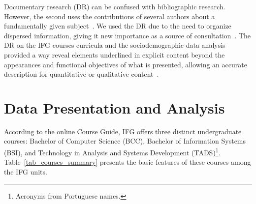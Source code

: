 \documentclass[sigconf, review]{educomp}
\begin{document}
Documentary research (DR) can be confused with bibliographic research. However, the second uses the contributions of several authors about a fundamentally given subject~\cite{gil2008metodos}.
We used the DR due to the need to organize dispersed information, giving it new importance as a source of consultation~\cite{prodanov2013metodologia}.
The DR on the IFG courses curricula and the sociodemographic data analysis provided a way reveal elements underlined in explicit content beyond the appearances and functional objectives of what is presented, allowing an accurate description for quantitative or qualitative content~\cite{bardin2011content, marconi2003fundamentos}.

\section{Data Presentation and Analysis}\label{DataPresentationandAnalysis}

According to the online Course Guide, IFG offers three distinct undergraduate courses: Bachelor of Computer Science (BCC), Bachelor of Information Systems (BSI), and Technology in Analysis and Systems Development (TADS)\footnote{Acronyms from Portuguese names.}.
Table~\ref{tab_courses_summary} presents the basic features of these courses among the IFG units.
\begin{table}[!ht]
\centering
\caption{Summary of the IFG's Computer Science-related undergraduate courses.}
\label{tab_courses_summary}
\end{table}
\end{document}
